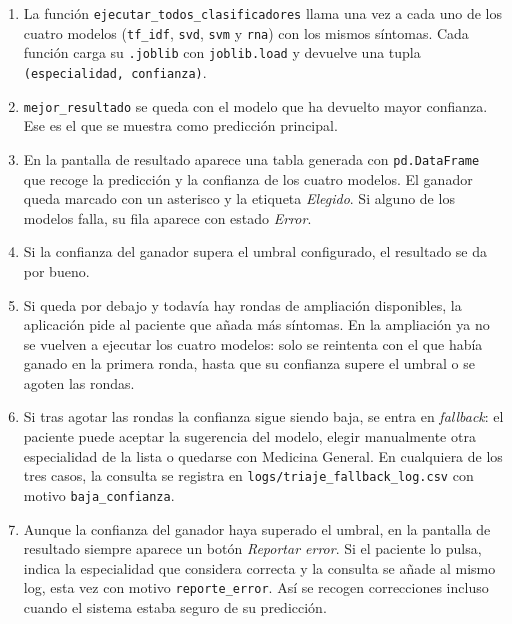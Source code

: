 \begin{enumerate}
	\item La función \texttt{ejecutar\_todos\_clasificadores} llama una vez a cada uno de los cuatro modelos (\texttt{tf\_idf}, \texttt{svd}, \texttt{svm} y \texttt{rna}) con los mismos síntomas. Cada función carga su \texttt{.joblib} con \texttt{joblib.load} y devuelve una tupla \texttt{(especialidad, confianza)}.
	
	\item \texttt{mejor\_resultado} se queda con el modelo que ha devuelto mayor confianza. Ese es el que se muestra como predicción principal.
	
	\item En la pantalla de resultado aparece una tabla generada con \texttt{pd.DataFrame} que recoge la predicción y la confianza de los cuatro modelos. El ganador queda marcado con un asterisco y la etiqueta \textit{Elegido}. Si alguno de los modelos falla, su fila aparece con estado \textit{Error}.
	
	\item Si la confianza del ganador supera el umbral configurado, el resultado se da por bueno.
	
	\item Si queda por debajo y todavía hay rondas de ampliación disponibles, la aplicación pide al paciente que añada más síntomas. En la ampliación ya no se vuelven a ejecutar los cuatro modelos: solo se reintenta con el que había ganado en la primera ronda, hasta que su confianza supere el umbral o se agoten las rondas.
	
	\item Si tras agotar las rondas la confianza sigue siendo baja, se entra en \textit{fallback}: el paciente puede aceptar la sugerencia del modelo, elegir manualmente otra especialidad de la lista o quedarse con Medicina General. En cualquiera de los tres casos, la consulta se registra en \texttt{logs/triaje\_fallback\_log.csv} con motivo \texttt{baja\_confianza}.
	
	\item Aunque la confianza del ganador haya superado el umbral, en la pantalla de resultado siempre aparece un botón \textit{Reportar error}. Si el paciente lo pulsa, indica la especialidad que considera correcta y la consulta se añade al mismo log, esta vez con motivo \texttt{reporte\_error}. Así se recogen correcciones incluso cuando el sistema estaba seguro de su predicción.
\end{enumerate}

